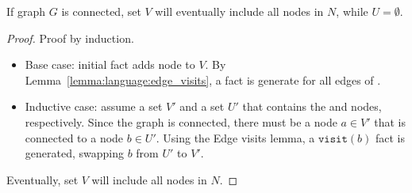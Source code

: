 \begin{theorem}
If graph $G$ is connected, set $V$ will eventually include all nodes in $N$,
while $U = \emptyset$.
\end{theorem}
\begin{proof}
Proof by induction.

\begin{itemize}

   \item Base case: initial fact  adds node  to $V$.
      By Lemma~\ref{lemma:language:edge_visits}, a  fact is generate
      for all edges of .

   \item Inductive case: assume a set $V'$ and a set $U'$ that contains the
    and  nodes, respectively. Since the graph
   is connected, there must be a node $a \in V'$ that is connected to a node $b
   \in U'$. Using the Edge visits lemma, a $\mathtt{visit}(b)$ fact is generated,
   swapping $b$ from $U'$ to $V'$.
\end{itemize}

Eventually, set $V$ will include all nodes in $N$.
\end{proof}

